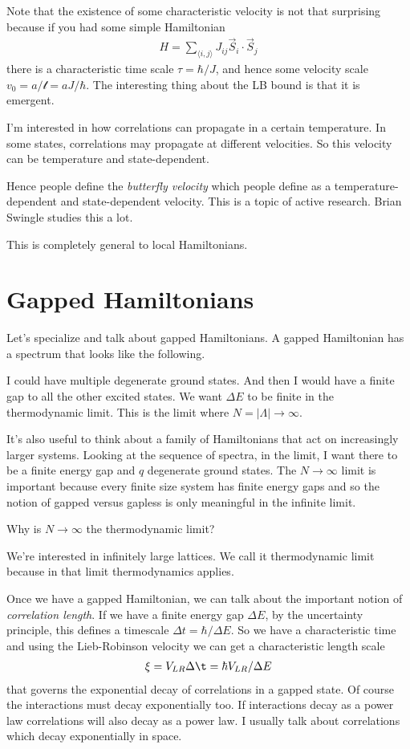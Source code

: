 Note that the existence of some characteristic velocity is not that surprising
because if you had some simple Hamiltonian
\begin{align}
    H = \sum_{\langle i, j \rangle}
    J_{ij} \vec{S}_i\cdot \vec{S}_j
\end{align}
there is a characteristic time scale $\tau = \hbar/J$,
and hence some velocity scale $v_0 = a/\mathcal{t} = aJ/\hbar$.
The interesting thing about the LB bound is that it is emergent.

I'm interested in how correlations can propagate in a certain temperature.
In some states, correlations may propagate at different velocities.
So this velocity can be temperature and state-dependent.

Hence people define the \emph{butterfly velocity}
which people define as a temperature-dependent and state-dependent velocity.
This is a topic of active research.
Brian Swingle studies this a lot.

This is completely general to local Hamiltonians.

\section{Gapped Hamiltonians}
Let's specialize and talk about gapped Hamiltonians.
A gapped Hamiltonian has a spectrum that looks like the following.

I could have multiple degenerate ground states.
And then I would have a finite gap to all the other excited states.
We want $\Delta E$ to be finite in the thermodynamic limit.
This is the limit where $N=|\Lambda|\to\infty$.

It's also useful to think about a family of Hamiltonians that act on
increasingly larger systems.
Looking at the sequence of spectra, in the limit, I want there to be a finite
energy gap and $q$ degenerate ground states.
The $N\to\infty$ limit is important because every finite size system has finite
energy gaps and so the notion of gapped versus gapless is only meaningful in the
infinite limit.

\begin{question}
    Why is $N\to\infty$ the thermodynamic limit?
\end{question}
We're interested in infinitely large lattices.
We call it thermodynamic limit because in that limit thermodynamics applies.

Once we have a gapped Hamiltonian, we can talk about the important notion of
\emph{correlation length}.
If we have a finite energy gap $\Delta E$, by the uncertainty principle,
this defines a timescale $\Delta t=\hbar/\Delta E$.
So we have a characteristic time and using the Lieb-Robinson velocity we can
get a characteristic length scale
\begin{align}
    \xi = V_{LR}\Delta\t = \hbar V_{LR}/\Delta E
\end{align}
that governs the exponential decay of correlations in a gapped state.
Of course the interactions must decay exponentially too.
If interactions decay as a power law correlations will also decay as a power
law.
I usually talk about correlations which decay exponentially in space.

